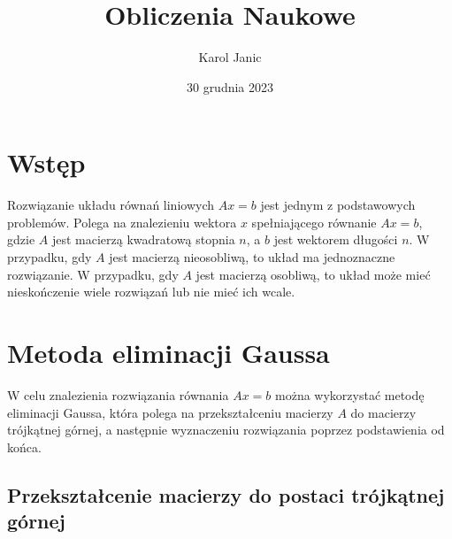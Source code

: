 \documentclass{article}
\title{Obliczenia Naukowe}
\author{Karol Janic}
\date{30 grudnia 2023}
\begin{document}
\begin{titlingpage}
    \maketitle
\end{titlingpage}

\tableofcontents

\newpage

\section{Wstęp}
Rozwiązanie układu równań liniowych $Ax = b$ jest jednym z podstawowych problemów. Polega na znalezieniu wektora $x$ spełniającego równanie $Ax = b$, gdzie $A$ jest macierzą kwadratową stopnia $n$, a $b$ jest wektorem długości $n$. 
W przypadku, gdy $A$ jest macierzą nieosobliwą, to układ ma jednoznaczne rozwiązanie. W przypadku, gdy $A$ jest macierzą osobliwą, to układ może mieć nieskończenie wiele rozwiązań lub nie mieć ich wcale.

\section{Metoda eliminacji Gaussa}
W celu znalezienia rozwiązania równania $Ax=b$ można wykorzystać metodę eliminacji Gaussa, która polega na przekształceniu macierzy $A$ do macierzy trójkątnej górnej, 
a następnie wyznaczeniu rozwiązania poprzez podstawienia od końca.
\subsection{Przekształcenie macierzy do postaci trójkątnej górnej}
\end{document}
